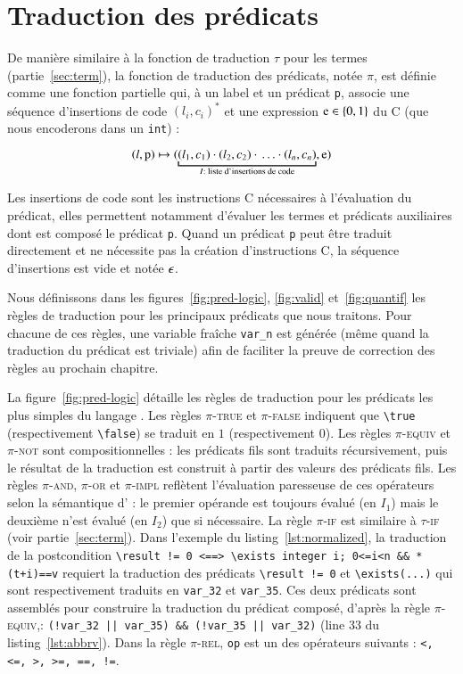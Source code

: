 \section{Traduction des prédicats \eacsl}
\label{sec:pred}


De manière similaire à la fonction de traduction $\tau$ pour les termes
(partie~\ref{sec:term}), la fonction de traduction des prédicats, notée $\pi$,
est définie comme une fonction partielle qui, à un label et un prédicat \eacsl
\lstinline'p', associe une séquence d'insertions de code $(l_i, c_i)^*$ et une
expression $\mbox{\lstinline'e'} \in \{0, 1\}$  du C (que nous encoderons dans
un \lstinline'int') :

\[
(l, \mbox{\lstinline'p'}) \rulearrow
(\underbracket{(l_1, c_1) \concat (l_2, c_2) \concat \ldots
  \concat (l_n, c_n)}_{I : \text{ liste d'insertions de code}}, \mbox{\lstinline'e'})
\]

Les insertions de code sont les instructions C nécessaires à l'évaluation du
prédicat, elles permettent notamment d'évaluer les termes et prédicats
auxiliaires dont est composé le prédicat \lstinline'p'.
Quand un prédicat \lstinline'p' peut être traduit directement et ne nécessite
pas la création d'instructions C, la séquence d'insertions est vide et notée
$\epsilon$.

Nous définissons dans les figures~\ref{fig:pred-logic}, \ref{fig:valid}
et~\ref{fig:quantif} les règles de traduction pour les principaux
prédicats \eacsl que nous traitons.
Pour chacune de ces règles, une variable fraîche \lstinline'var_n' est générée
(même quand la traduction du prédicat est triviale) afin de faciliter la preuve
de correction des règles au prochain chapitre.

La figure~\ref{fig:pred-logic} détaille les règles de traduction pour les
prédicats les plus simples du langage \eacsl.
Les règles \textsc{$\pi$-true} et \textsc{$\pi$-false} indiquent que
\lstinline'\true' (respectivement \lstinline'\false') se traduit en $1$
(respectivement $0$).
Les règles \textsc{$\pi$-equiv} et \textsc{$\pi$-not} sont compositionnelles :
les prédicats fils sont traduits récursivement, puis le résultat de la
traduction est construit à partir des valeurs des prédicats fils.
Les règles \textsc{$\pi$-and}, \textsc{$\pi$-or} et \textsc{$\pi$-impl}
reflètent l'évaluation paresseuse de ces opérateurs selon la sémantique d'\eacsl
: le premier opérande est toujours évalué (en $I_1$) mais le deuxième n'est
évalué (en $I_2$) que si nécessaire.
La règle \textsc{$\pi$-if} est similaire à \textsc{$\tau$-if} (voir
partie~\ref{sec:term}).
Dans l'exemple du listing~\ref{lst:normalized}, la traduction de la
postcondition
\lstinline{\result != 0 <==> \exists integer i; 0<=i<n && *(t+i)==v} requiert
la traduction des prédicats \lstinline|\result != 0| et
\lstinline{\exists(...)} qui sont respectivement traduits en \lstinline|var_32|
et \lstinline|var_35|.
Ces deux prédicats sont assemblés pour construire la traduction du prédicat
composé, d'après la règle \textsc{$\pi$-equiv},:
\lstinline{(!var_32 || var_35) && (!var_35 || var_32)} (line 33 du
listing~\ref{lst:abbrv}).
Dans la règle \textsc{$\pi$-rel}, \lstinline|op| est un des opérateurs suivants
: \lstinline[style=c]{<, <=, >, >=, ==, !=}.

